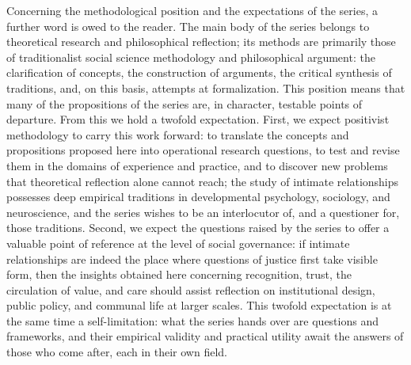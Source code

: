 Concerning the methodological position and the expectations of the series, a further word is owed to the reader. The main body of the series belongs to theoretical research and philosophical reflection; its methods are primarily those of traditionalist social science methodology and philosophical argument: the clarification of concepts, the construction of arguments, the critical synthesis of traditions, and, on this basis, attempts at formalization. This position means that many of the propositions of the series are, in character, testable points of departure. From this we hold a twofold expectation. First, we expect positivist methodology to carry this work forward: to translate the concepts and propositions proposed here into operational research questions, to test and revise them in the domains of experience and practice, and to discover new problems that theoretical reflection alone cannot reach; the study of intimate relationships possesses deep empirical traditions in developmental psychology, sociology, and neuroscience, and the series wishes to be an interlocutor of, and a questioner for, those traditions. Second, we expect the questions raised by the series to offer a valuable point of reference at the level of social governance: if intimate relationships are indeed the place where questions of justice first take visible form, then the insights obtained here concerning recognition, trust, the circulation of value, and care should assist reflection on institutional design, public policy, and communal life at larger scales. This twofold expectation is at the same time a self-limitation: what the series hands over are questions and frameworks, and their empirical validity and practical utility await the answers of those who come after, each in their own field.

